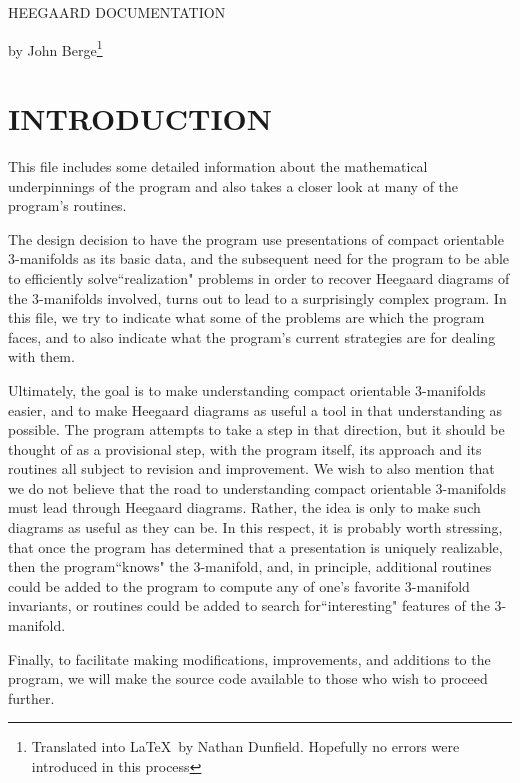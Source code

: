 \documentclass[12pt]{amsart}
\begin{document}
\begin{center}
{\Large HEEGAARD DOCUMENTATION}

by John Berge\footnote{Translated into \LaTeX\ by Nathan Dunfield.
  Hopefully no errors were introduced in this process}
\end{center}

                                                                                
\section{INTRODUCTION}
                
                
This file includes some detailed information about the mathematical
underpinnings of the program and also takes a closer look at many of
the program's routines.

The design decision to have the program use presentations of compact
orientable 3-manifolds as its basic data, and the subsequent need for
the program to be able to efficiently solve``realization" problems in
order to recover Heegaard diagrams of the 3-manifolds involved, turns
out to lead to a surprisingly complex program. In this file, we try to
indicate what some of the problems are which the program faces, and to
also indicate what the program's current strategies are for dealing
with them.

Ultimately, the goal is to make understanding compact orientable
3-manifolds easier, and to make Heegaard diagrams as useful a tool in
that understanding as possible. The program attempts to take a step in
that direction, but it should be thought of as a provisional step,
with the program itself, its approach and its routines all subject to
revision and improvement. We wish to also mention that we do not
believe that the road to understanding compact orientable 3-manifolds
must lead through Heegaard diagrams.  Rather, the idea is only to make
such diagrams as useful as they can be. In this respect, it is
probably worth stressing, that once the program has determined that a
presentation is uniquely realizable, then the program``knows" the
3-manifold, and, in principle, additional routines could be added to
the program to compute any of one's favorite 3-manifold invariants, or
routines could be added to search for``interesting" features of the
3-manifold.

Finally, to facilitate making modifications, improvements, and
additions to the program, we will make the source code available to
those who wish to proceed further.
\end{document}
